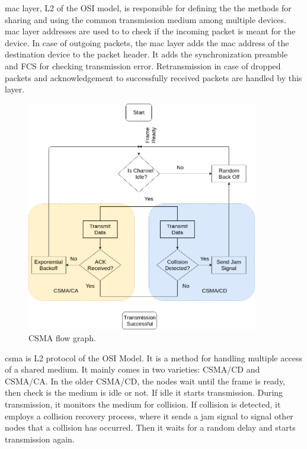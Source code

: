 \ac{mac} layer, \ac{L2} of the \ac{OSI} model, is responsible for defining the the methods for sharing and using the common transmission medium among multiple devices.
\ac{mac} layer addresses are used to to check if the incoming packet is meant for the device.
In case of outgoing packets, the \ac{mac} layer adds the \ac{mac} address of the destination device to the packet header.
It adds the synchronization preamble and \ac{FCS} for checking transmission error.
Retransmission in case of dropped packets and acknowledgement to successfully received packets are handled by this layer.\\

\begin{figure}[h!]
\label{Csma_flow}
\centering
\includegraphics[width=0.9\textwidth]{Figure/CSMA.png}
\caption{CSMA flow graph.}
\end{figure}

\ac{csma} is \ac{L2} protocol of the OSI Model. 
It is a method for handling multiple access of a shared medium.
It mainly comes in two varieties: \ac{CSMA/CD}  and \ac{CSMA/CA}. In the older \ac{CSMA/CD}, the nodes wait until the frame is ready, then check is the medium is idle or not.
If idle it starts transmission.
During transmission, it monitors the medium for collision.
If collision is detected, it employs a collision recovery process, where it sends a jam signal to signal other nodes that a collision has occurred.
Then it waits for a  random delay and starts transmission again.\\

